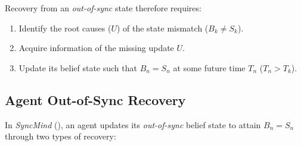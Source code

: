 Recovery from an \textit{out-of-sync} state therefore requires:
\vspace{-5pt}
\begin{enumerate}[leftmargin=*,itemsep=2pt,topsep=0pt,parsep=0pt,label=(\arabic*)]
    \item Identify the root causes ($U$) of the state mismatch ($B_k \neq S_k$).
    \item Acquire information of the missing update $U$.
    \item Update its belief state such that $B_n = S_n$ at some future time $T_n$ ($T_n>T_k$).
\end{enumerate}




\subsection{Agent Out-of-Sync Recovery}
\label{Section: Recovery Settings}

In \textit{SyncMind} (), an agent updates its \textit{out-of-sync} belief state to attain $B_n=S_n$ through two types of recovery: 






